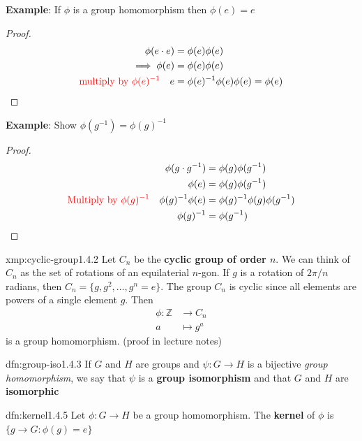 \documentclass{article}
\begin{document}
\textbf{Example}: If $\phi$ is a group homomorphism then $\phi(e) = e$
\begin{proof}
    \begin{align*}
        \phi(e \cdot e) &= \phi(e) \phi(e) \\
        \implies \phi(e) &= \phi(e) \phi(e) \\
        \text{\color{red}{multiply by $\phi(e)^{-1}$}} \quad e &= \phi(e)^{-1}\phi(e)\phi(e) = \phi(e)
    \end{align*}
\end{proof}

\textbf{Example}: Show $\phi(g^{-1}) = \phi(g)^{-1}$
\begin{proof}
    \begin{align*}
        \phi(g \cdot g^{-1}) &= \phi(g)\phi(g^{-1})\\
        \phi(e) &= \phi(g)\phi(g^{-1})\\
        \text{\color{red}{Multiply by $\phi(g)^{-1}$}} \quad \phi(g)^{-1} \phi(e) &= \phi(g)^{-1} \phi(g) \phi(g^{-1}) \\
        \phi(g)^{-1} &= \phi(g^{-1})
    \end{align*}
\end{proof}

\begin{xmp}{xmp:cyclic-group}{1.4.2}
    Let $C_{n}$ be the \textbf{cyclic group of order $n$}. We can think of $C_{n}$ as the set of rotations of an equilaterial $n$-gon. If $g$ is a rotation of $2\pi / n$ radians, then $C_{n} = \{g, g^{2},\dots,g^{n} = e\}$. The group $C_{n}$ is cyclic since all elements are powers of a single element $g$. Then
    \begin{align*}
        \phi : \mathbb{Z} &\to C_{n}\\
        a & \mapsto g^{a}
    \end{align*}
    is a group homomorphism. (proof in lecture notes)
\end{xmp}

\begin{dfn}{dfn:group-iso}{1.4.3}
    If $G$ and $H$ are groups and $\psi : G \to H$ is a bijective \textit{group homomorphism}, we say that $\psi$ is a \textbf{group isomorphism} and that $G$ and $H$ are \textbf{isomorphic}
\end{dfn}

\begin{dfn}{dfn:kernel}{1.4.5}
    Let $\phi : G \to H$ be a group homomorphism. The \textbf{kernel} of $\phi$ is $\{g \to G : \phi(g) = e\}$
\end{dfn}
\end{document}
